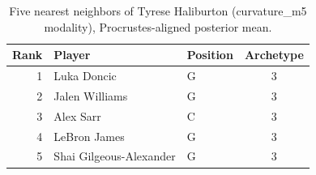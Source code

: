 \begin{table}[htbp]
  \centering\small
  \begin{tabular}{rllc}
    \toprule
    Rank & Player & Position & Archetype \\
    \midrule
    1 & Luka Doncic & G & 3 \\
    2 & Jalen Williams & G & 3 \\
    3 & Alex Sarr & C & 3 \\
    4 & LeBron James & G & 3 \\
    5 & Shai Gilgeous-Alexander & G & 3 \\
    \bottomrule
  \end{tabular}
  \caption{Five nearest neighbors of Tyrese Haliburton (curvature_m5 modality), Procrustes-aligned posterior mean.}
  \label{tab:Tyrese_Haliburton_neighbors_curvature_m5}
\end{table}

